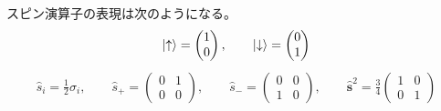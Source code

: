 \documentclass[uplatex,dvipdfmx,a4paper,11pt]{jlreq}
\theoremstyle{definition}
\begin{document}
\begin{proposition}
  スピン演算子の表現は次のようになる。
  \begin{align}
    \ket{\uparrow} = \begin{pmatrix}
                       1 \\
                       0
                     \end{pmatrix}, \qquad
    \ket{\downarrow} = \begin{pmatrix}
                         0 \\
                         1
                       \end{pmatrix}
  \end{align}
  \begin{align}
    \hat{s}_i = \frac{1}{2}\sigma_i, \qquad
    \hat{s}_+ = \begin{pmatrix}
                  0 & 1 \\
                  0 & 0
                \end{pmatrix}, \qquad
    \hat{s}_- = \begin{pmatrix}
                  0 & 0 \\
                  1 & 0
                \end{pmatrix}, \qquad
    \hat{\bm{s}}^2 = \frac{3}{4}\begin{pmatrix}
                                  1 & 0 \\
                                  0 & 1
                                \end{pmatrix}
  \end{align}
\end{proposition}
\end{document}

